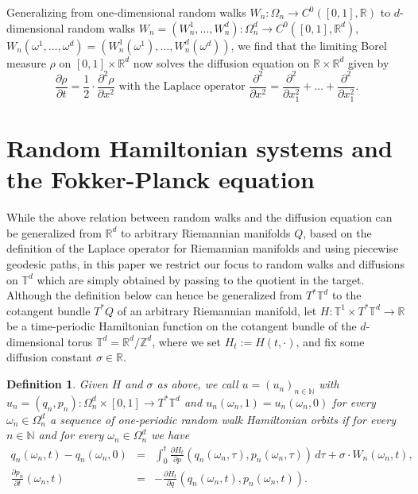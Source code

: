 \documentclass[a4paper,11pt]{amsart}
\newcommand{\NN}{\mathbb{N}}
\newcommand{\ZZ}{\mathbb{Z}}
\newcommand{\RR}{\mathbb{R}}
\newcommand{\TT}{\mathbb{T}}
\newtheorem{definition}[theorem]{Definition}
\begin{document}
Generalizing from one-dimensional random walks $W_n:\Omega_n\to C^0([0,1],\RR)$ to $d$-dimensional random walks $W_n=(W_n^1,\ldots,W_n^d):\Omega_n^d\to C^0([0,1],\RR^d)$, $W_n(\omega^1,\ldots,\omega^d)=(W_n^1(\omega^1),\ldots,W_n^d(\omega^d))$, we find that the limiting Borel measure $\rho$ on $[0,1]\times\RR^d$ now solves the diffusion equation on $\RR\times\RR^d$ given by  \[\frac{\partial\rho}{\partial t} = \frac{1}{2}\cdot\frac{\partial^2\rho}{\partial x^2}\,\,\textrm{with the Laplace operator}\,\,\frac{\partial^2}{\partial x^2}=\frac{\partial^2}{\partial x_1^2}+\ldots+\frac{\partial^2}{\partial x_1^2}.\]

\section{Random Hamiltonian systems and the Fokker-Planck equation}
While the above relation between random walks and the diffusion equation can be generalized from $\RR^d$ to arbitrary Riemannian manifolds $Q$, based on the definition of the Laplace operator for Riemannian manifolds and using piecewise geodesic paths, in this paper we restrict our focus to random walks and diffusions on $\TT^d$ which are simply obtained by passing to the quotient in the target. Although the definition below can hence be generalized from $T^*\TT^d$ to the cotangent bundle $T^*Q$ of an arbitrary Riemannian manifold, let  
$H:\TT^1\times T^*\TT^d\to\RR$ be a time-periodic Hamiltonian function on the cotangent bundle of the $d$-dimensional torus $\TT^d=\RR^d/\ZZ^d$, where we set $H_t:=H(t,\cdot)$, and fix some diffusion constant $\sigma\in\RR$. 
\begin{definition}\label{stoch_sol}
Given $H$ and $\sigma$ as above, we call $u=(u_n)_{n\in\NN}$ with $u_n=(q_n,p_n):\Omega_n^d\times [0,1]\to T^*\TT^d$ and $u_n(\omega_n,1)=u_n(\omega_n,0)$ for every $\omega_n\in\Omega_n^d$ a \emph{sequence of one-periodic random walk Hamiltonian orbits} if for every $n\in\NN$ and for every $\omega_n\in\Omega_n^d$ we have 
\begin{eqnarray*}
 q_n(\omega_n,t)-q_n(\omega_n,0)&=&\int_0^t \frac{\partial H_t}{\partial p}(q_n(\omega_n,\tau),p_n(\omega_n,\tau))\,d\tau + \sigma\cdot W_n(\omega_n,t),\\ \frac{\partial p_n}{\partial t}(\omega_n,t)&=&-\frac{\partial H_t}{\partial q}(q_n(\omega_n,t),p_n(\omega_n,t)).
 \end{eqnarray*}
\end{definition}
\end{document}
